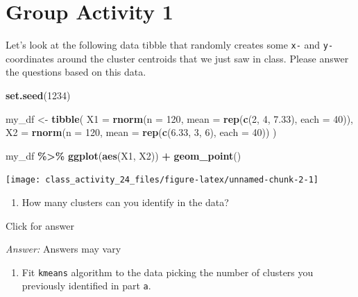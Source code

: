 \documentclass[
]{book}
\newenvironment{Shaded}{\begin{snugshade}}{\end{snugshade}}
\newcommand{\AttributeTok}[1]{\textcolor[rgb]{0.13,0.29,0.53}{#1}}
\newcommand{\DecValTok}[1]{\textcolor[rgb]{0.00,0.00,0.81}{#1}}
\newcommand{\FloatTok}[1]{\textcolor[rgb]{0.00,0.00,0.81}{#1}}
\newcommand{\FunctionTok}[1]{\textcolor[rgb]{0.13,0.29,0.53}{\textbf{#1}}}
\newcommand{\NormalTok}[1]{#1}
\newcommand{\OtherTok}[1]{\textcolor[rgb]{0.56,0.35,0.01}{#1}}
\newcommand{\SpecialCharTok}[1]{\textcolor[rgb]{0.81,0.36,0.00}{\textbf{#1}}}
\providecommand{\tightlist}{%
  \setlength{\itemsep}{0pt}\setlength{\parskip}{0pt}}
\begin{document}
\hypertarget{group-activity-1-9}{%
\section{Group Activity 1}\label{group-activity-1-9}}

Let's look at the following data tibble that randomly creates some \texttt{x-} and \texttt{y-} coordinates around the cluster centroids that we just saw in class. Please answer the questions based on this data.

\begin{Shaded}
\begin{Highlighting}[]
\FunctionTok{set.seed}\NormalTok{(}\DecValTok{1234}\NormalTok{)}

\NormalTok{my\_df }\OtherTok{\textless{}{-}} \FunctionTok{tibble}\NormalTok{(}
  \AttributeTok{X1 =} \FunctionTok{rnorm}\NormalTok{(}\AttributeTok{n =} \DecValTok{120}\NormalTok{, }\AttributeTok{mean =} \FunctionTok{rep}\NormalTok{(}\FunctionTok{c}\NormalTok{(}\DecValTok{2}\NormalTok{, }\DecValTok{4}\NormalTok{, }\FloatTok{7.33}\NormalTok{), }\AttributeTok{each =} \DecValTok{40}\NormalTok{)),}
  \AttributeTok{X2 =} \FunctionTok{rnorm}\NormalTok{(}\AttributeTok{n =} \DecValTok{120}\NormalTok{, }\AttributeTok{mean =} \FunctionTok{rep}\NormalTok{(}\FunctionTok{c}\NormalTok{(}\FloatTok{6.33}\NormalTok{, }\DecValTok{3}\NormalTok{, }\DecValTok{6}\NormalTok{), }\AttributeTok{each =} \DecValTok{40}\NormalTok{))}
\NormalTok{)}

\NormalTok{my\_df }\SpecialCharTok{\%\textgreater{}\%}
  \FunctionTok{ggplot}\NormalTok{(}\FunctionTok{aes}\NormalTok{(X1, X2)) }\SpecialCharTok{+}
  \FunctionTok{geom\_point}\NormalTok{() }
\end{Highlighting}
\end{Shaded}

\texttt{[image: class\_activity\_24\_files/figure-latex/unnamed-chunk-2-1]}

\begin{enumerate}
\def\labelenumi{\alph{enumi}.}
\tightlist
\item
  How many clusters can you identify in the data?
\end{enumerate}

Click for answer

\emph{Answer:} Answers may vary

\begin{enumerate}
\def\labelenumi{\alph{enumi}.}
\setcounter{enumi}{1}
\tightlist
\item
  Fit \texttt{kmeans} algorithm to the data picking the number of clusters you previously identified in part \texttt{a}.
\end{enumerate}
\end{document}
